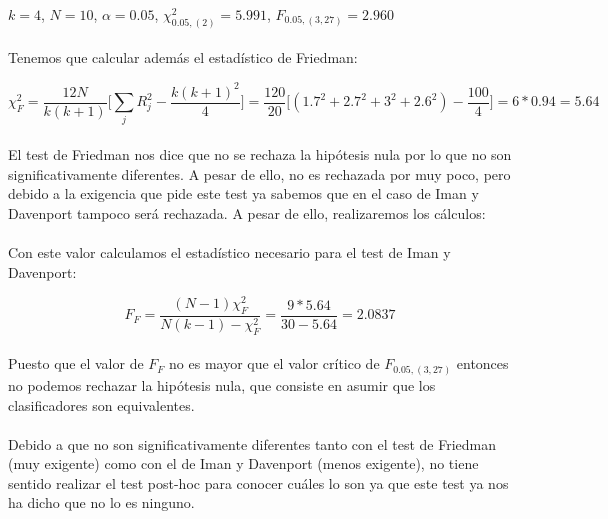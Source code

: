 \documentclass[10pt, a4paper,spanish]{article}
\begin{document}
		$k = 4$, $N =10$,
		$\alpha = 0.05$,
		$\chi_{0.05,(2)}^2= 5.991$,
		$F_{0.05, (3,27)} =  2.960$

		\paragraph{}
		Tenemos que calcular además el estadístico de Friedman:

		\[
		\chi_{F}^2 = \frac{12N}{k(k+1)}\Big[\displaystyle\sum_{j}R_{j}^2 - \frac{k(k+1)^2}{4}\Big] = \frac{120}{20}\Big[(1.7^2+ 2.7^2+3^2+2.6^2) - \frac{100}{4}\Big] = 6 * 0.94 = 5.64\]

		\paragraph{}
		El test de Friedman nos dice que no se rechaza la hipótesis nula por lo que no son significativamente diferentes. A pesar de ello, no es rechazada por muy poco, pero debido a la exigencia que pide este test ya sabemos que en el caso de Iman y Davenport tampoco será rechazada. A pesar de ello, realizaremos los cálculos:

		\paragraph{}
		Con este valor calculamos el estadístico necesario para el test de Iman y Davenport:

		\[F_{F}= \frac{(N-1)\chi_{F}^2}{N(k-1)-\chi_{F}^2} = \frac{9 * 5.64}{30-5.64} = 2.0837 \]

		\paragraph{}
		Puesto que el valor de $F_{F}$ no es mayor que el valor crítico de $F_{0.05, (3,27)}$ entonces no podemos rechazar la hipótesis nula, que consiste en asumir que los clasificadores son equivalentes.

		\paragraph{}
		Debido a que no son significativamente diferentes tanto con el test de Friedman (muy exigente) como con el de Iman y Davenport (menos exigente), no tiene sentido realizar el test post-hoc para conocer cuáles lo son ya que este test ya nos ha dicho que no lo es ninguno.
\end{document}
